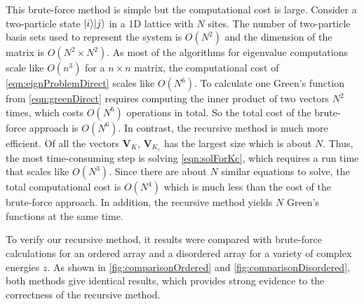 This brute-force method is simple but the computational cost is large. Consider a 
two-particle state $| i \rangle| j \rangle$ in a 1D lattice with $N$ sites. The number of two-particle basis sets used
to represent the system is $O(N^2)$ and the dimension of the matrix is $O(N^2 \times N^2)$. As most of the 
algorithms for eigenvalue computations scale like $O(n^3)$ for a $n\times n$ matrix, the computational cost of
\autoref{eqn:eignProblemDirect} scales like $O(N^6)$. To calculate one Green's function from 
\autoref{eqn:greenDirect} requires computing the inner product of  two vectors $N^2$ times, which 
costs $O(N^6)$ operations in total. So the total cost of the brute-force approach is $O(N^6)$. 
In contrast, the recursive method is much more efficient. Of all the vectors $\mathbf{V}_{K}$,  $\mathbf{V}_{K_c}$
has the largest size which is about $N$. Thus, the most time-consuming step is solving \autoref{eqn:solForKc},
which requires a run time that scales like $O(N^3)$. Since there are about $N$ similar equations to solve, the total
computational cost is $O(N^4)$ which is much less than the cost of the brute-force approach. In addition, the
recursive method yields $N$ Green's functions at the same time.

To verify our recursive method, it results were compared with brute-force calculations for an ordered array and a disordered array for 
a variety of complex energies $z$. 
As shown in
 \autoref{fig:comparisonOrdered} and \autoref{fig:comparisonDisordered}, both methods give identical results, which
provides strong evidence to the correctness of the recursive method. 

